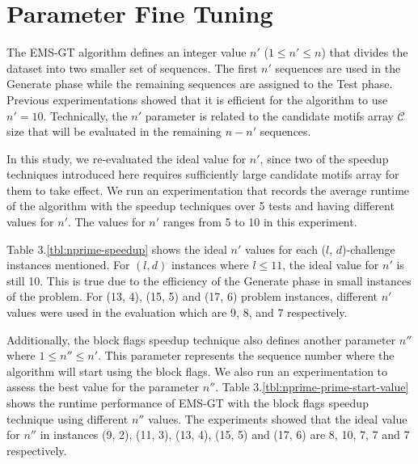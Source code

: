 
\section{Parameter Fine Tuning}
The EMS-GT algorithm defines an integer value $n'$ ($1 \leq n' \leq n$) that divides the dataset into two smaller set of sequences. The first $n'$ sequences are used in the Generate phase while the remaining sequences are assigned to the Test phase. Previous experimentations \cite{sia2015} showed that it is efficient for the algorithm to use $n' = 10$. Technically, the $n'$ parameter is related to the candidate motifs array $\mathcal{C}$ size that will be evaluated in the remaining $n - n'$ sequences.

In this study, we re-evaluated the ideal value for $n'$, since two of the speedup techniques introduced here requires sufficiently large candidate motifs array for them to take effect. We run an experimentation that records the average runtime of the algorithm with the speedup techniques over 5 tests and having different values for $n'$. The values for $n'$ ranges from 5 to 10 in this experiment.

Table 3.\ref{tbl:nprime-speedup} shows the ideal $n'$ values for each ($l$, $d$)-challenge instances mentioned. For $(l, d)$ instances where $l \leq 11$, the ideal value for $n'$ is still 10. This is true due to the efficiency of the Generate phase in small instances of the problem. For (13, 4), (15, 5) and (17, 6) problem instances, different $n'$ values were used in the evaluation which are 9, 8, and 7 respectively.



Additionally, the block flags speedup technique also defines another parameter $n''$ where $1 \leq n'' \leq n'$. This parameter represents the sequence number where the algorithm will start using the block flags. We also run an experimentation to assess the best value for the parameter $n''$. Table 3.\ref{tbl:nprime-prime-start-value} shows the runtime performance of EMS-GT with the block flags speedup technique using different $n''$ values. The experiments showed that the ideal value for $n''$ in instances (9, 2), (11, 3), (13, 4), (15, 5) and (17, 6) are 8, 10, 7, 7 and 7 respectively.



